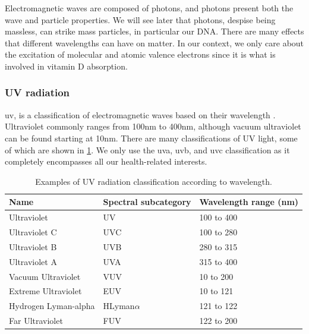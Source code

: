 Electromagnetic waves are composed of photons, and photons present both the wave and particle properties. We will see later that photons, despise being massless, can strike mass particles, in particular our DNA. There are many effects that different wavelengths can have on matter. In our context, we only care about the excitation of molecular and atomic valence electrons since it is what is involved in vitamin D absorption.

\subsubsection{UV radiation}

\gls{uv}, is a classification of electromagnetic waves based on their wavelength \cite{ref:ISOUV}. Ultraviolet commonly ranges from 100nm to 400nm, although vacuum ultraviolet can be found starting at 10nm. There are many classifications of UV light, some of which are shown in \ref{table:uvExamples}. We only use the \gls{uva}, \gls{uvb}, and \gls{uvc} classification as it  completely encompasses all our health-related interests.

\begin{table}[h!]

	\centering
    \caption{Examples of UV radiation classification according to wavelength.}
	\begin{tabular}{|lll|}
		
		\hline
			\rowcolor[HTML]{CBCEFB} 
				Name & Spectral subcategory & Wavelength range (nm) \\ \hline
				\rowcolor[HTML]{EFEFEF} 
				Ultraviolet          & UV                   & 100 to 400            \\
				Ultraviolet C        & UVC                  & 100 to 280            \\
				Ultraviolet B        & UVB                  & 280 to 315            \\
				Ultraviolet A        & UVA                  & 315 to 400            \\ \hline
				\rowcolor[HTML]{EFEFEF} 
				Vacuum Ultraviolet   & VUV                  & 10 to 200             \\
				Extreme Ultraviolet  & EUV                  & 10 to 121             \\
				Hydrogen Lyman-alpha & HLyman$\alpha$       & 121 to 122            \\
				Far Ultraviolet      & FUV                  & 122 to 200            \\ \hline
	\end{tabular}
    \label{table:uvExamples}
\end{table}

